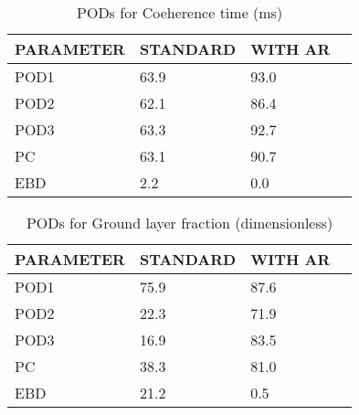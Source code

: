 \documentclass[11pt,english]{article}
\begin{document}
\begin{table}[]
\begin{center}
\begin{tabular}{|l|l|l|l|}
\hline
\multicolumn{1}{|c|}{\cellcolor[HTML]{C0C0C0}\textbf{PARAMETER}} & \multicolumn{1}{c|}{\cellcolor[HTML]{C0C0C0}\textbf{STANDARD}} & \multicolumn{1}{c|}{\cellcolor[HTML]{C0C0C0}\textbf{WITH AR}} \\
\hline
\cellcolor[HTML]{C0C0C0}POD1  & 63.9                                & 93.0         \\
\cellcolor[HTML]{C0C0C0}POD2  & 62.1                                & 86.4         \\
\cellcolor[HTML]{C0C0C0}POD3  & 63.3                                & 92.7         \\
\cellcolor[HTML]{C0C0C0}PC    & 63.1                                  & 90.7           \\
\cellcolor[HTML]{C0C0C0}EBD   & 2.2                                 & 0.0          \\
\hline
\end{tabular}
\caption{PODs for Coeherence time (ms)}
\end{center}
\end{table}
\begin{table}[]
\begin{center}
\begin{tabular}{|l|l|l|l|}
\hline
\multicolumn{1}{|c|}{\cellcolor[HTML]{C0C0C0}\textbf{PARAMETER}} & \multicolumn{1}{c|}{\cellcolor[HTML]{C0C0C0}\textbf{STANDARD}} & \multicolumn{1}{c|}{\cellcolor[HTML]{C0C0C0}\textbf{WITH AR}} \\
\hline
\cellcolor[HTML]{C0C0C0}POD1  & 75.9                                & 87.6         \\
\cellcolor[HTML]{C0C0C0}POD2  & 22.3                                & 71.9         \\
\cellcolor[HTML]{C0C0C0}POD3  & 16.9                                & 83.5         \\
\cellcolor[HTML]{C0C0C0}PC    & 38.3                                  & 81.0           \\
\cellcolor[HTML]{C0C0C0}EBD   & 21.2                                 & 0.5          \\
\hline
\end{tabular}
\caption{PODs for Ground layer fraction (dimensionless)}
\end{center}
\end{table}
\end{document}
